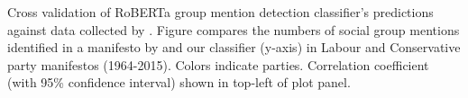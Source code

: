Cross validation of RoBERTa group mention detection classifier's predictions against data collected by \citet{thau_how_2019}. Figure compares the numbers of social group mentions identified in a manifesto by \citet[see x-axis]{thau_how_2019} and our classifier (y-axis) in Labour and Conservative party manifestos (1964-2015). Colors indicate parties. Correlation coefficient (with 95\% confidence interval) shown in top-left of plot panel. \label{fig:uk_manifestos_sg_counts_cross_validation}
